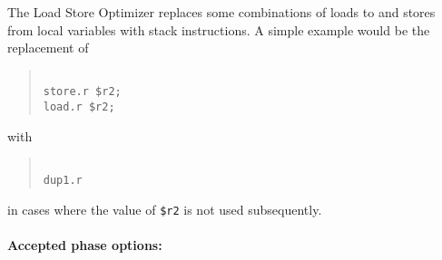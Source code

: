 \documentclass{article}
\begin{document}
The Load Store Optimizer replaces some combinations of loads to and stores from local variables with stack instructions. A simple example would be the replacement of

\begin{quote}\begin{verbatim}

store.r $r2;
load.r $r2;

\end{verbatim}\end{quote}

with 

\begin{quote}\begin{verbatim}

dup1.r

\end{verbatim}\end{quote}

in cases where the value of {\tt \$r2} is not used subsequently.


\paragraph{Accepted phase options:} 
\end{document}

